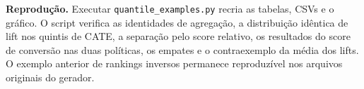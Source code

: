 \noindent\textbf{Reprodução.} Executar \texttt{quantile\_examples.py} recria as tabelas, CSVs e o gráfico. O script verifica as identidades de agregação, a distribuição idêntica de lift nos quintis de CATE, a separação pelo score relativo, os resultados do score de conversão nas duas políticas, os empates e o contraexemplo da média dos lifts. O exemplo anterior de rankings inversos permanece reproduzível nos arquivos originais do gerador.
